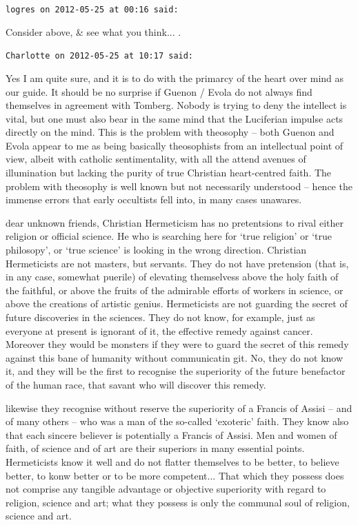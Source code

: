 \begin{footnotesize}
\begin{sffamily}
\hfill

\texttt{logres on 2012-05-25 at 00:16 said:}

Consider above, \& see what you think... .

\hfill

\texttt{Charlotte on 2012-05-25 at 10:17 said:}

Yes I am quite sure, and it is to do with the primarcy of the heart over mind as our guide. It should be no surprise if Guenon / Evola do not always find themselves in agreement with Tomberg. Nobody is trying to deny the intellect is vital, but one must also bear in the same mind that the Luciferian impulse acts directly on the mind. This is the problem with theosophy -- both Guenon and Evola appear to me as being basically theosophists from an intellectual point of view, albeit with catholic sentimentality, with all the attend avenues of illumination but lacking the purity of true Christian heart-centred faith. The problem with theosophy is well known but not necessarily understood -- hence the immense errors that early occultists fell into, in many cases unawares.

dear unknown friends, Christian Hermeticism has no pretentsions to rival either religion or official science. He who is searching here for `true religion' or `true philosopy', or `true science' is looking in the wrong direction. Christian Hermeticists are not masters, but servants. They do not have pretension (that is, in any case, somewhat puerile) of elevating themselvess above the holy faith of the faithful, or above the fruits of the admirable efforts of workers in science, or above the creations of artistic genius. Hermeticists are not guarding the secret of future discoveries in the sciences. They do not know, for example, just as everyone at present is ignorant of it, the effective remedy against cancer. Moreover they would be monsters if they were to guard the secret of this remedy against this bane of humanity without communicatin git. No, they do not know it, and they will be the first to recognise the superiority of the future benefactor of the human race, that savant who will discover this remedy.

likewise they recognise without reserve the superiority of a Francis of Assisi -- and of many others -- who was a man of the so-called `exoteric' faith. They know also that each sincere believer is potentially a Francis of Assisi. Men and women of faith, of science and of art are their superiors in many essential points. Hermeticists know it well and do not flatter themselves to be better, to believe better, to konw better or to be more competent... That which they possess does not comprise any tangible advantage or objective superiority with regard to religion, science and art; what they possess is only the communal soul of religion, science and art.


\end{sffamily}
\end{footnotesize}
